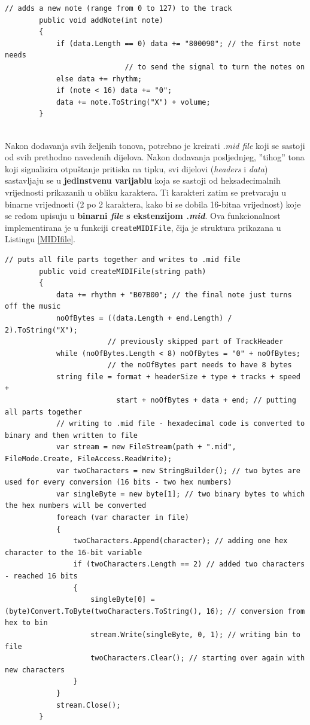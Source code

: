 \documentclass[12pt,a4paper]{article}
\begin{document}
\begin{lstlisting}[language={[Sharp]C}, caption={Metoda za dodavanje tonova u MIDI \textit{file}}, label={MIDInote}]
// adds a new note (range from 0 to 127) to the track
        public void addNote(int note)
        {
            if (data.Length == 0) data += "800090"; // the first note needs
                            // to send the signal to turn the notes on
            else data += rhythm;
            if (note < 16) data += "0";
            data += note.ToString("X") + volume;
        }
\end{lstlisting}
~\\
Nakon dodavanja svih željenih tonova, potrebno je kreirati \textit{.mid file} koji se sastoji od svih prethodno navedenih dijelova. Nakon dodavanja posljednjeg, ''tihog'' tona koji signalizira otpuštanje pritiska na tipku, svi dijelovi (\textit{headers} i \textit{data}) sastavljaju se u \textbf{jedinstvenu varijablu} koja se sastoji od heksadecimalnih vrijednosti prikazanih u obliku karaktera. Ti karakteri zatim se pretvaraju u binarne vrijednosti (2 po 2 karaktera, kako bi se dobila 16-bitna vrijednost) koje se redom upisuju u \textbf{binarni \textit{file} s ekstenzijom \textit{.mid}}. Ova funkcionalnost implementirana je u funkciji \texttt{createMIDIFile}, čija je struktura prikazana u Listingu \ref{MIDIfile}.

\begin{lstlisting}[language={[Sharp]C}, caption={Spajanje svih dijelova MIDI \textit{file}-a i kreiranje \textit{.mid file}-a}, label={MIDIfile}]
        // puts all file parts together and writes to .mid file
        public void createMIDIFile(string path)
        {
            data += rhythm + "B07B00"; // the final note just turns off the music
            noOfBytes = ((data.Length + end.Length) / 2).ToString("X");
            			// previously skipped part of TrackHeader
            while (noOfBytes.Length < 8) noOfBytes = "0" + noOfBytes;
            			// the noOfBytes part needs to have 8 bytes
            string file = format + headerSize + type + tracks + speed +
                          start + noOfBytes + data + end; // putting all parts together
            // writing to .mid file - hexadecimal code is converted to binary and then written to file
            var stream = new FileStream(path + ".mid", FileMode.Create, FileAccess.ReadWrite);
            var twoCharacters = new StringBuilder(); // two bytes are used for every conversion (16 bits - two hex numbers)
            var singleByte = new byte[1]; // two binary bytes to which the hex numbers will be converted
            foreach (var character in file)
            {
                twoCharacters.Append(character); // adding one hex character to the 16-bit variable
                if (twoCharacters.Length == 2) // added two characters - reached 16 bits
                {
                    singleByte[0] = (byte)Convert.ToByte(twoCharacters.ToString(), 16); // conversion from hex to bin
                    stream.Write(singleByte, 0, 1); // writing bin to file
                    twoCharacters.Clear(); // starting over again with new characters
                }
            }
            stream.Close();
        }
\end{lstlisting}
\end{document}
